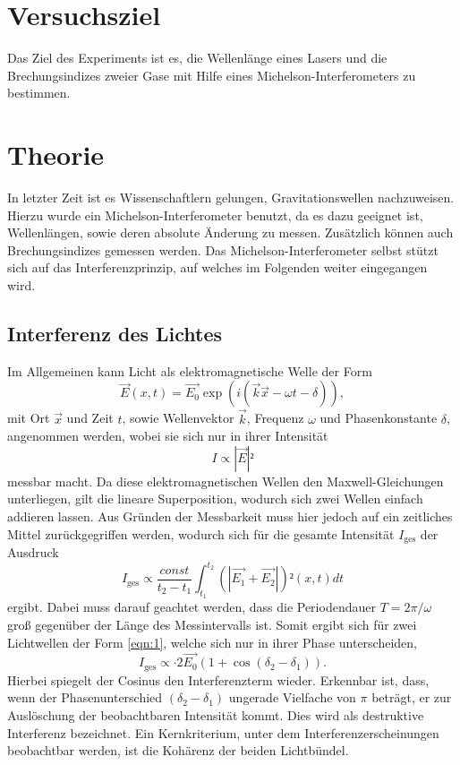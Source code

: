 \section{Versuchsziel}
\label{sec:Versuchsziel}
Das Ziel des Experiments ist es, die Wellenlänge eines Lasers und die Brechungsindizes zweier Gase mit Hilfe eines Michelson-Interferometers zu bestimmen.

\section{Theorie}
\label{sec:Theorie}

In letzter Zeit ist es Wissenschaftlern gelungen, Gravitationswellen nachzuweisen.
Hierzu wurde ein Michelson-Interferometer benutzt, da es dazu geeignet ist, Wellenlängen, sowie deren absolute Änderung zu messen.
Zusätzlich können auch Brechungsindizes gemessen werden.
Das Michelson-Interferometer selbst stützt sich auf das Interferenzprinzip, auf welches im Folgenden weiter eingegangen wird.\\
\subsection{Interferenz des Lichtes}
Im Allgemeinen kann Licht als elektromagnetische Welle der Form
\begin{equation}
  \vec{E}(x,t) = \vec{E_0}\exp{(i(\vec{k}\vec{x}-\omega t -\delta))}, \label{eqn:1}
\end{equation}
mit Ort $\vec{x}$ und Zeit $t$, sowie Wellenvektor $\vec{k}$, Frequenz $\omega$ und Phasenkonstante $\delta$, angenommen werden, wobei sie sich nur in ihrer Intensität
\begin{equation}
  I \propto |\vec{E}|²
\end{equation}
messbar macht.
Da diese elektromagnetischen Wellen den Maxwell-Gleichungen unterliegen, gilt die lineare Superposition, wodurch sich zwei Wellen einfach addieren lassen.
Aus Gründen der Messbarkeit muss hier jedoch auf ein zeitliches Mittel zurückgegriffen werden, wodurch sich für die gesamte Intensität $I_{\text{ges}}$ der Ausdruck
\begin{equation}
  I_{\text{ges}} \propto \frac{const}{t_2-t_1} \int_{t_1}^{t_2} (|\vec{E_1}+\vec{E_2}|)²(x,t) dt
\end{equation}
ergibt. Dabei muss darauf geachtet werden, dass die Periodendauer $T = 2\pi/\omega$ groß gegenüber der Länge des Messintervalls ist.
Somit ergibt sich für zwei Lichtwellen der Form \eqref{eqn:1}, welche sich nur in ihrer Phase unterscheiden,
\begin{equation}
  I_{\text{ges}} \propto \cdot 2\vec{E_0}(1+\cos{(\delta_2-\delta_1)}).
\end{equation}
Hierbei spiegelt der Cosinus den Interferenzterm wieder.
Erkennbar ist, dass, wenn der Phasenunterschied $(\delta_2-\delta_1)$ ungerade Vielfache von $\pi$ beträgt, er zur Auslöschung der beobachtbaren Intensität kommt.
Dies wird als destruktive Interferenz bezeichnet.
Ein Kernkriterium, unter dem Interferenzerscheinungen beobachtbar werden, ist die Kohärenz der beiden Lichtbündel.\\

